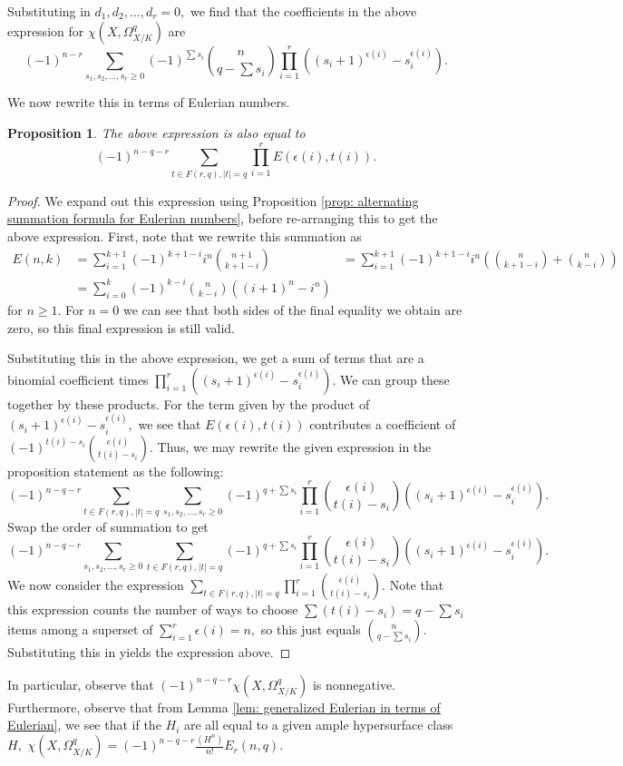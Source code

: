 \documentclass{article}
\newtheorem{prop}[thm]{Proposition}
\theoremstyle{definition}
\theoremstyle{remark}
\begin{document}
Substituting in $d_1, d_2, \ldots, d_r = 0,$ we find that the coefficients in the above expression for $\chi(X, \Omega^q_{X/K})$ are \[(-1)^{n-r}\sum\limits_{s_1, s_2, \ldots, s_r \geq 0} (-1)^{\sum s_i}\binom{n}{q-\sum s_i} \prod\limits_{i=1}^r \left((s_i + 1)^{\epsilon(i)}-s_i^{\epsilon(i)} \right).\]
\par We now rewrite this in terms of Eulerian numbers.
\begin{prop}\label{prop: expression for cohomology in terms of Eulerian numbers}
The above expression is also equal to \[(-1)^{n-q-r} \sum\limits_{t \in F(r, q), |t| = q}\prod\limits_{i=1}^r E(\epsilon(i), t(i)).\]
\end{prop}
\begin{proof}
We expand out this expression using Proposition \ref{prop: alternating summation formula for Eulerian numbers}, before re-arranging this to get the above expression. First, note that we rewrite this summation as \begin{align*}E(n, k)  & = \sum\limits_{i=1}^{k+1} (-1)^{k + 1 - i} i^n \binom{n+1}{ k + 1 - i} & = \sum\limits_{i=1}^{k+1} (-1)^{k + 1 - i} i^n \left(\binom{n}{ k + 1 - i} + \binom{n}{k-i}\right) \\ & = \sum\limits_{i=0}^{k}(-1)^{k-i}\binom{n}{k-i}((i+1)^n - i^n)\end{align*} for $n \geq 1.$ For $n = 0$ we can see that both sides of the final equality we obtain are zero, so this final expression is still valid.
\par Substituting this in the above expression, we get a sum of terms that are a binomial coefficient times $\prod\limits_{i=1}^r ((s_i+1)^{\epsilon(i)} - s_i^{\epsilon(i)}).$ We can group these together by these products. For the term given by the product of $(s_i+1)^{\epsilon(i)} - s_i^{\epsilon(i)},$ we see that $E(\epsilon(i), t(i))$ contributes a coefficient of $(-1)^{t(i) - s_i} \binom{\epsilon(i)}{t(i) - s_i}.$ Thus, we may rewrite the given expression in the proposition statement as the following:
\[(-1)^{n-q-r} \sum\limits_{t \in F(r, q), |t| = q} \sum\limits_{s_1, s_2, \ldots, s_r \geq 0} (-1)^{q + \sum s_i} \prod\limits_{i=1}^r \binom{\epsilon(i)}{t(i) - s_i} ((s_i+1)^{\epsilon(i)} - s_i^{\epsilon(i)}).\] Swap the order of summation to get \[(-1)^{n-q-r}  \sum\limits_{s_1, s_2, \ldots, s_r \geq 0} \sum\limits_{t \in F(r, q), |t| = q}(-1)^{q + \sum s_i} \prod\limits_{i=1}^r \binom{\epsilon(i)}{t(i) - s_i} ((s_i+1)^{\epsilon(i)} - s_i^{\epsilon(i)}).\] We now consider the expression $\sum\limits_{t \in F(r, q), |t| = q} \prod\limits_{i=1}^r \binom{\epsilon(i)}{t(i) - s_i}.$ Note that this expression counts the number of ways to choose $\sum (t(i)-s_i) = q - \sum s_i$ items among a superset of $\sum\limits_{i=1}^r \epsilon(i) = n,$ so this just equals $\binom{n}{q - \sum s_i}.$ Substituting this in yields the expression above.
\end{proof}
In particular, observe that $(-1)^{n-q-r}\chi(X, \Omega^q_{X/K})$ is nonnegative. Furthermore, observe that from Lemma \ref{lem: generalized Eulerian in terms of Eulerian}, we see that if the $H_i$ are all equal to a given ample hypersurface class $H,$ $\chi(X, \Omega^q_{X/K}) = (-1)^{n-q-r}\frac{(H^n)}{n!} E_r(n, q).$
\end{document}
